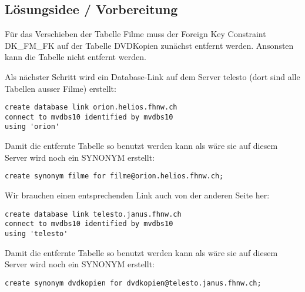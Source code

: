 \documentclass[11pt,a4paper,parskip=half]{scrartcl}
\begin{document}
\subsection{Lösungsidee / Vorbereitung}
Für das Verschieben der Tabelle \glqq{}Filme\grqq{} muss der Foreign Key Constraint \glqq{}DK\_FM\_FK\grqq{} auf der Tabelle \glqq{}DVDKopien\grqq{} zunächst entfernt werden. Ansonsten kann die Tabelle nicht entfernt werden.

Als nächster Schritt wird ein Database-Link auf dem Server telesto (dort sind alle Tabellen ausser Filme) erstellt:

\begin{lstlisting}
create database link orion.helios.fhnw.ch
connect to mvdbs10 identified by mvdbs10
using 'orion'
\end{lstlisting}

Damit die entfernte Tabelle so benutzt werden kann als wäre sie auf diesem Server wird noch ein SYNONYM erstellt:
\begin{lstlisting}
create synonym filme for filme@orion.helios.fhnw.ch;
\end{lstlisting}

Wir brauchen einen entsprechenden Link auch von der anderen Seite her:

\begin{lstlisting}
create database link telesto.janus.fhnw.ch
connect to mvdbs10 identified by mvdbs10
using 'telesto'
\end{lstlisting}

Damit die entfernte Tabelle so benutzt werden kann als wäre sie auf diesem Server wird noch ein SYNONYM erstellt:
\begin{lstlisting}
create synonym dvdkopien for dvdkopien@telesto.janus.fhnw.ch;
\end{lstlisting}
\end{document}
